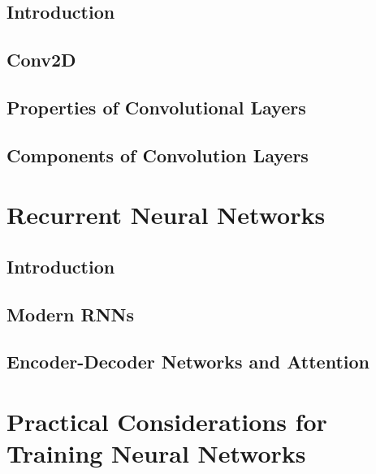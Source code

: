 \documentclass[13pt,compress]{beamer}
\begin{document}
\subsection{Introduction}

\subsection{Conv2D}

\subsection{Properties of Convolutional Layers}

\subsection{Components of Convolution Layers}

\section{Recurrent Neural Networks}
\subsection{Introduction}



\subsection{Modern RNNs}

\subsection{Encoder-Decoder Networks and Attention}


\section{Practical Considerations for Training Neural Networks}
\end{document}
